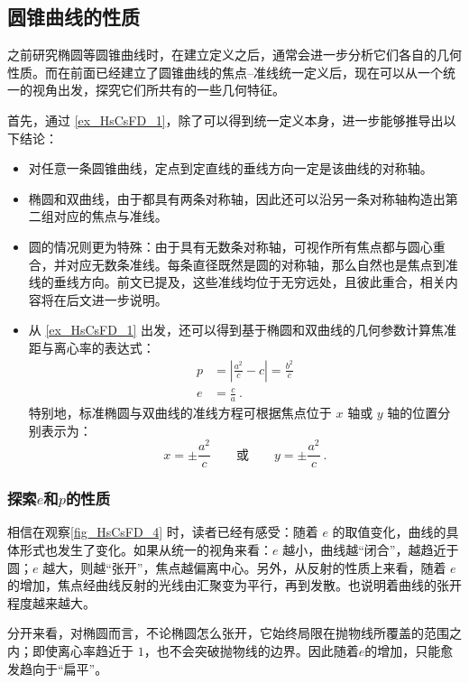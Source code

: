 \subsection{圆锥曲线的性质}

之前研究椭圆等圆锥曲线时，在建立定义之后，通常会进一步分析它们各自的几何性质。而在前面已经建立了圆锥曲线的焦点–准线统一定义后，现在可以从一个统一的视角出发，探究它们所共有的一些几何特征。

首先，通过 \autoref{ex_HsCsFD_1}，除了可以得到统一定义本身，进一步能够推导出以下结论：
\begin{itemize}
\item 对任意一条圆锥曲线，定点到定直线的垂线方向一定是该曲线的对称轴。
\item 椭圆和双曲线，由于都具有两条对称轴，因此还可以沿另一条对称轴构造出第二组对应的焦点与准线。
\item 圆的情况则更为特殊：由于具有无数条对称轴，可视作所有焦点都与圆心重合，并对应无数条准线。每条直径既然是圆的对称轴，那么自然也是焦点到准线的垂线方向。前文已提及，这些准线均位于无穷远处，且彼此重合，相关内容将在后文进一步说明。
\item 从 \autoref{ex_HsCsFD_1} 出发，还可以得到基于椭圆和双曲线的几何参数计算焦准距与离心率的表达式：
\begin{equation}
\begin{split}
p &= \left| \frac{a^2}{c} - c \right| = \frac{b^2}{c}\\
e &= \frac{c}{a}~.
\end{split}
\end{equation}
特别地，标准椭圆与双曲线的准线方程可根据焦点位于 $x$ 轴或 $y$ 轴的位置分别表示为：
\begin{equation}
x = \pm\frac{a^2}{c} \qquad \text{或} \qquad y = \pm\frac{a^2}{c}~.
\end{equation}
\end{itemize}

\subsubsection{探索$e$和$p$的性质}


相信在观察\autoref{fig_HsCsFD_4} 时，读者已经有感受：随着 $e$ 的取值变化，曲线的具体形式也发生了变化。如果从统一的视角来看：$e$ 越小，曲线越“闭合”，越趋近于圆；$e$ 越大，则越“张开”，焦点越偏离中心。另外，从反射的性质上来看，随着 $e$ 的增加，焦点经曲线反射的光线由汇聚变为平行，再到发散。也说明着曲线的张开程度越来越大。

分开来看，对椭圆而言，不论椭圆怎么张开，它始终局限在抛物线所覆盖的范围之内；即使离心率趋近于 $1$，也不会突破抛物线的边界。因此随着$e$的增加，只能愈发趋向于“扁平”。

